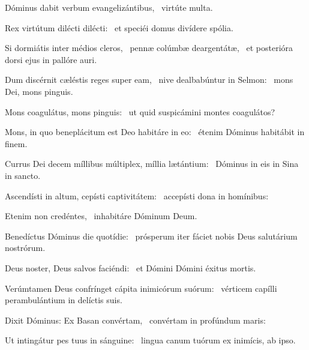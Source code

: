 
\item Dóminus dabit verbum evangelizántibus,~\psstar{} virtúte multa.

\item Rex virtútum dilécti dilécti:~\psstar{} et speciéi domus divídere spólia.

\item Si dormiátis inter médios cleros,~\pscross{} pennæ colúmbæ deargentátæ,~\psstar{} et posterióra dorsi ejus in pallóre auri.

\item Dum discérnit cæléstis reges super eam,~\pscross{} nive dealbabúntur in Selmon:~\psstar{} mons Dei, mons pinguis.

\item Mons coagulátus, mons pinguis:~\psstar{} ut quid suspicámini montes coagulátos?

\item Mons, in quo beneplácitum est Deo habitáre in eo:~\psstar{} étenim Dóminus habitábit in finem.

\item Currus Dei decem míllibus múltiplex, míllia lætántium:~\psstar{} Dóminus in eis in Sina in sancto.

\item Ascendísti in altum, cepísti captivitátem:~\psstar{} accepísti dona in homínibus:

\item Etenim non credéntes,~\psstar{} inhabitáre Dóminum Deum.

\item Benedíctus Dóminus die quotídie:~\psstar{} prósperum iter fáciet nobis Deus salutárium nostrórum.

\item Deus noster, Deus salvos faciéndi:~\psstar{} et Dómini Dómini éxitus mortis.

\item Verúmtamen Deus confrínget cápita inimicórum suórum:~\psstar{} vérticem capílli perambulántium in delíctis suis.

\item Dixit Dóminus: Ex Basan convértam,~\psstar{} convértam in profúndum maris:

\item Ut intingátur pes tuus in sánguine:~\psstar{} lingua canum tuórum ex inimícis, ab ipso.


